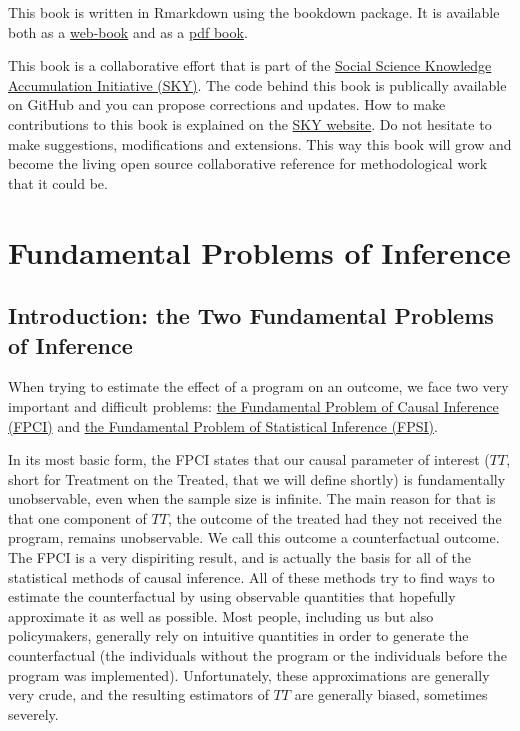 \documentclass[
]{book}
\theoremstyle{definition}
\theoremstyle{definition}
\theoremstyle{definition}
\theoremstyle{definition}
\theoremstyle{remark}
\begin{document}
This book is written in Rmarkdown using the bookdown package.
It is available both as a \href{https://chabefer.github.io/STCI/}{web-book} and as a \href{https://chabefer.github.io/STCI/STCI.pdf}{pdf book}.

This book is a collaborative effort that is part of the \href{https://chabefer.github.io/SKY/}{Social Science Knowledge Accumulation Initiative (SKY)}.
The code behind this book is publically available on GitHub and you can propose corrections and updates.
How to make contributions to this book is explained on the \href{https://chabefer.github.io/SKY/tutoSTCI.html}{SKY website}.
Do not hesitate to make suggestions, modifications and extensions.
This way this book will grow and become the living open source collaborative reference for methodological work that it could be.

\hypertarget{part-fundamental-problems-of-inference}{%
\part{Fundamental Problems of Inference}\label{part-fundamental-problems-of-inference}}

\hypertarget{introduction-the-two-fundamental-problems-of-inference}{%
\chapter*{Introduction: the Two Fundamental Problems of Inference}\label{introduction-the-two-fundamental-problems-of-inference}}

When trying to estimate the effect of a program on an outcome, we face two very important and difficult problems: \href{FPCI.html}{the Fundamental Problem of Causal Inference (FPCI)} and \href{FPSI.html}{the Fundamental Problem of Statistical Inference (FPSI)}.

In its most basic form, the FPCI states that our causal parameter of interest (\(TT\), short for Treatment on the Treated, that we will define shortly) is fundamentally unobservable, even when the sample size is infinite.
The main reason for that is that one component of \(TT\), the outcome of the treated had they not received the program, remains unobservable.
We call this outcome a counterfactual outcome.
The FPCI is a very dispiriting result, and is actually the basis for all of the statistical methods of causal inference.
All of these methods try to find ways to estimate the counterfactual by using observable quantities that hopefully approximate it as well as possible.
Most people, including us but also policymakers, generally rely on intuitive quantities in order to generate the counterfactual (the individuals without the program or the individuals before the program was implemented).
Unfortunately, these approximations are generally very crude, and the resulting estimators of \(TT\) are generally biased, sometimes severely.
\end{document}
